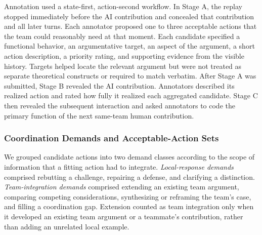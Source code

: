 \documentclass[manuscript,review,anonymous]{acmart}
\begin{document}
Annotation used a state-first, action-second workflow. In Stage A, the replay stopped immediately before the AI contribution and concealed that contribution and all later turns. Each annotator proposed one to three acceptable actions that the team could reasonably need at that moment. Each candidate specified a functional behavior, an argumentative target, an aspect of the argument, a short action description, a priority rating, and supporting evidence from the visible history. Targets helped locate the relevant argument but were not treated as separate theoretical constructs or required to match verbatim. After Stage A was submitted, Stage B revealed the AI contribution. Annotators described its realized action and rated how fully it realized each aggregated candidate. Stage C then revealed the subsequent interaction and asked annotators to code the primary function of the next same-team human contribution.

\subsubsection{Coordination Demands and Acceptable-Action Sets}

We grouped candidate actions into two demand classes according to the scope of information that a fitting action had to integrate. \emph{Local-response demands} comprised rebutting a challenge, repairing a defense, and clarifying a distinction. \emph{Team-integration demands} comprised extending an existing team argument, comparing competing considerations, synthesizing or reframing the team's case, and filling a coordination gap. Extension counted as team integration only when it developed an existing team argument or a teammate's contribution, rather than adding an unrelated local example.
\end{document}
